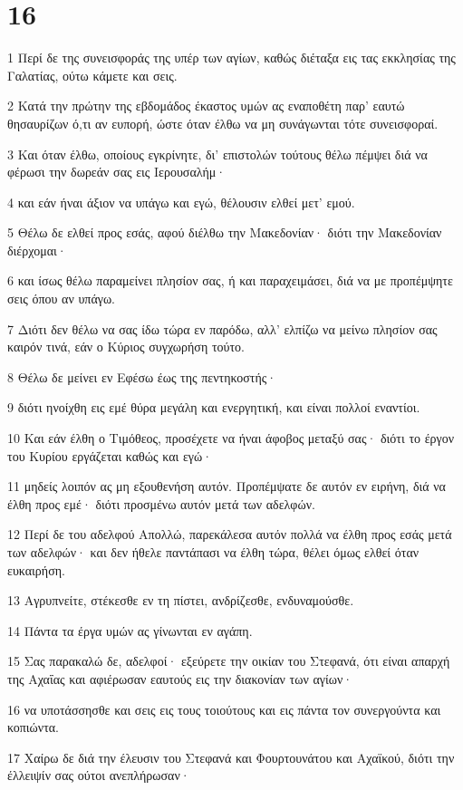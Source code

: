 \chapter{16}

\par 1 Περί δε της συνεισφοράς της υπέρ των αγίων, καθώς διέταξα εις τας εκκλησίας της Γαλατίας, ούτω κάμετε και σεις.
\par 2 Κατά την πρώτην της εβδομάδος έκαστος υμών ας εναποθέτη παρ' εαυτώ θησαυρίζων ό,τι αν ευπορή, ώστε όταν έλθω να μη συνάγωνται τότε συνεισφοραί.
\par 3 Και όταν έλθω, οποίους εγκρίνητε, δι' επιστολών τούτους θέλω πέμψει διά να φέρωσι την δωρεάν σας εις Ιερουσαλήμ·
\par 4 και εάν ήναι άξιον να υπάγω και εγώ, θέλουσιν ελθεί μετ' εμού.
\par 5 Θέλω δε ελθεί προς εσάς, αφού διέλθω την Μακεδονίαν· διότι την Μακεδονίαν διέρχομαι·
\par 6 και ίσως θέλω παραμείνει πλησίον σας, ή και παραχειμάσει, διά να με προπέμψητε σεις όπου αν υπάγω.
\par 7 Διότι δεν θέλω να σας ίδω τώρα εν παρόδω, αλλ' ελπίζω να μείνω πλησίον σας καιρόν τινά, εάν ο Κύριος συγχωρήση τούτο.
\par 8 Θέλω δε μείνει εν Εφέσω έως της πεντηκοστής·
\par 9 διότι ηνοίχθη εις εμέ θύρα μεγάλη και ενεργητική, και είναι πολλοί εναντίοι.
\par 10 Και εάν έλθη ο Τιμόθεος, προσέχετε να ήναι άφοβος μεταξύ σας· διότι το έργον του Κυρίου εργάζεται καθώς και εγώ·
\par 11 μηδείς λοιπόν ας μη εξουθενήση αυτόν. Προπέμψατε δε αυτόν εν ειρήνη, διά να έλθη προς εμέ· διότι προσμένω αυτόν μετά των αδελφών.
\par 12 Περί δε του αδελφού Απολλώ, παρεκάλεσα αυτόν πολλά να έλθη προς εσάς μετά των αδελφών· και δεν ήθελε παντάπασι να έλθη τώρα, θέλει όμως ελθεί όταν ευκαιρήση.
\par 13 Αγρυπνείτε, στέκεσθε εν τη πίστει, ανδρίζεσθε, ενδυναμούσθε.
\par 14 Πάντα τα έργα υμών ας γίνωνται εν αγάπη.
\par 15 Σας παρακαλώ δε, αδελφοί· εξεύρετε την οικίαν του Στεφανά, ότι είναι απαρχή της Αχαΐας και αφιέρωσαν εαυτούς εις την διακονίαν των αγίων·
\par 16 να υποτάσσησθε και σεις εις τους τοιούτους και εις πάντα τον συνεργούντα και κοπιώντα.
\par 17 Χαίρω δε διά την έλευσιν του Στεφανά και Φουρτουνάτου και Αχαϊκού, διότι την έλλειψίν σας ούτοι ανεπλήρωσαν·
